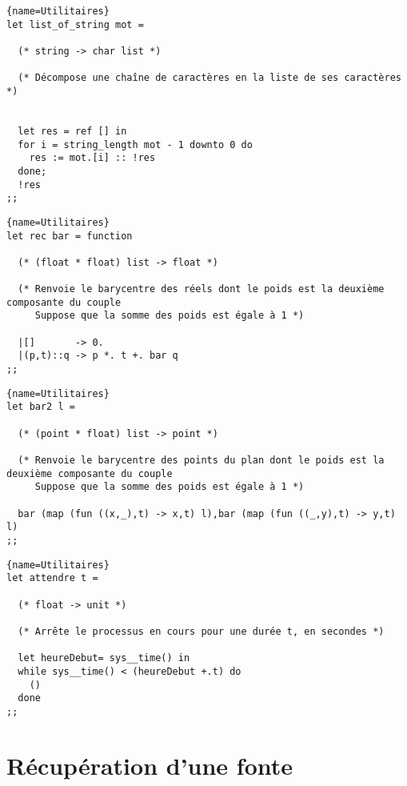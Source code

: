 \documentclass[10pt,twoside,a4paper]{article}
\begin{document}
\begin{lstlisting}{name=Utilitaires}
let list_of_string mot =

  (* string -> char list *)

  (* Décompose une chaîne de caractères en la liste de ses caractères *)

  
  let res = ref [] in
  for i = string_length mot - 1 downto 0 do
    res := mot.[i] :: !res
  done;
  !res
;;
\end{lstlisting}

\begin{lstlisting}{name=Utilitaires}
let rec bar = function

  (* (float * float) list -> float *)

  (* Renvoie le barycentre des réels dont le poids est la deuxième composante du couple
     Suppose que la somme des poids est égale à 1 *)

  |[]       -> 0.
  |(p,t)::q -> p *. t +. bar q
;;
\end{lstlisting}

\begin{lstlisting}{name=Utilitaires}
let bar2 l =

  (* (point * float) list -> point *)

  (* Renvoie le barycentre des points du plan dont le poids est la deuxième composante du couple
     Suppose que la somme des poids est égale à 1 *)
  
  bar (map (fun ((x,_),t) -> x,t) l),bar (map (fun ((_,y),t) -> y,t) l)
;;
\end{lstlisting}

\begin{lstlisting}{name=Utilitaires}
let attendre t =

  (* float -> unit *)
  
  (* Arrête le processus en cours pour une durée t, en secondes *)

  let heureDebut= sys__time() in
  while sys__time() < (heureDebut +.t) do
    ()
  done
;;
\end{lstlisting}

\section{Récupération d'une fonte}%
\end{document}
